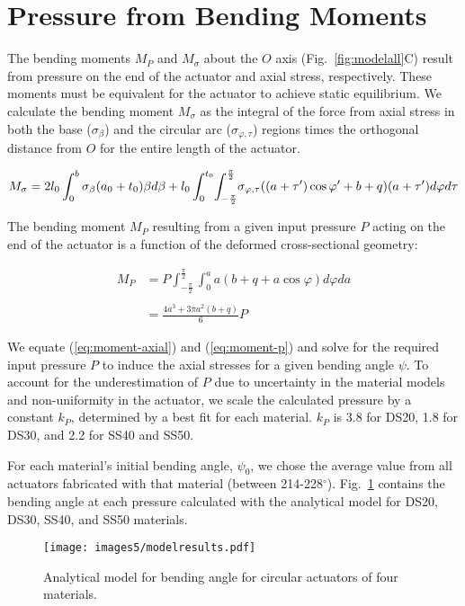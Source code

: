 \clearpage
\section{Pressure from Bending Moments}

The bending moments $M_P$ and $M_\sigma$ about the \(O\) axis (Fig.~\ref{fig:modelall}C) result from pressure on the end of the actuator and axial stress, respectively. These moments must be equivalent for the actuator to achieve static equilibrium. We calculate the bending moment $M_\sigma$ as the integral of the force from axial stress in both the base ($\sigma_{\beta}$) and the circular arc ($\sigma_{\varphi, \tau}$) regions times the orthogonal distance from \(O\) for the entire length of the actuator. 

\begin{equation}
    M_{\sigma} = 2l_{0} \int_{0}^{b} \sigma_{\beta} (a_0+t_0) \beta  d\beta
    + l_{0}\int_{0}^{t_0}\hspace{-2px}\int_{-\frac{\pi}{2}}^{\frac{\pi}{2}}\hspace{-2px}\sigma_{\varphi,\tau}((a+\tau')\cos{\varphi'}+b+q)(a+\tau') d\varphi d\tau
    \label{eq:moment-axial}
\end{equation}

The bending moment $M_P$ resulting from a given input pressure \(P\) acting on the end of the actuator is a function of the deformed cross-sectional geometry: 

\begin{align}
    M_P & = P \int_{-\frac{\pi}{2}}^{\frac{\pi}{2}}\int_0^{a} a(b+q+a\cos{\varphi})d\varphi da \\ \nonumber \\
    & = \frac{4 a^{3} + 3 \pi a^{2} (b+q)}{6} P 
    \label{eq:moment-p}
\end{align}

We equate (\ref{eq:moment-axial}) and (\ref{eq:moment-p}) and solve for the required input pressure $P$ to induce the axial stresses for a given bending angle $\psi$. To account for the underestimation of $P$ due to uncertainty in the material models and non-uniformity in the actuator, we scale the calculated pressure by a constant $k_P$, determined by a best fit for each material. $k_P$ is 3.8 for DS20, 1.8 for DS30, and 2.2 for SS40 and SS50. 

\clearpage
For each material's initial bending angle, $\psi_0$, we chose the average value from all actuators fabricated with that material (between 214-228$^\circ$). Fig.~\ref{fig:modelresults} contains the bending angle at each pressure calculated with the analytical model for DS20, DS30, SS40, and SS50 materials. 

\begin{figure}[!ht]
    \centering
    \texttt{[image: images5/modelresults.pdf]}
    \caption{Analytical model for bending angle for circular actuators of four materials.}
    \label{fig:modelresults}
\end{figure}
